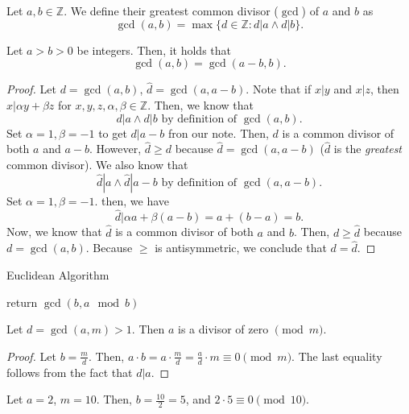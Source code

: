 \begin{definition}
	Let \( a,b \in \mathbb{Z} \). We define their greatest common divisor (\( \gcd \)) of \( a \) and \( b \) as \[
		\gcd(a,b) = \max\{d \in \mathbb{Z} : d|a \land d|b\}  
	.\] 
\end{definition}

\begin{prop}
	Let \( a>b>0 \) be integers. Then, it holds that \[
		\gcd (a,b) = \gcd (a-b,b)
	.\]
\end{prop}

\begin{proof}
	Let \( d=\gcd(a,b) \), \( \hat{d}=\gcd(a,a-b) \). Note that if \( x|y \) and \( x|z \), then \( x|\alpha y+\beta z \) for \( x,y,z,\alpha ,\beta \in \mathbb{Z} \). Then, we know that \[
		d|a \land d|b \text{ by definition of } \gcd(a,b)
	.\] Set \( \alpha =1,\beta =-1 \) to get \( d|a-b \) fron our note. Then, \( d \) is a common divisor of both \( a \) and \( a-b \). However, \( \hat{d}\ge d \) because \( \hat{d} = \gcd(a,a-b) \) (\( \hat{d} \) is the \emph{greatest} common divisor). We also know that \[
		\hat{d}|a \land \hat{d}|a-b \text{ by definition of } \gcd(a,a-b)
	.\] Set \( \alpha =1,\beta =-1 \). then, we have \[
		\hat{d}|\alpha a+\beta (a-b) = a + (b-a) = b
	.\] Now, we know that \( \hat{d} \) is a common divisor of both \( a \) and \( b \). Then, \( d \ge \hat{d} \) because \( d=\gcd(a,b) \). Because \( \ge   \) is antisymmetric, we conclude that \( d=\hat{d} \).
\end{proof}

\begin{algorithm}[H]
	\caption{Euclidean Algorithm}
	return $\gcd(b,a \mod b)$\;
\end{algorithm}

\begin{lemma}
	Let \( d=\gcd(a,m) > 1 \). Then \( a \) is a divisor of zero \( \pmod m \).
\end{lemma}

\begin{proof}
	Let \( b=\frac{m}{d} \). Then, \( a\cdot b=a\cdot \frac{m}{d}=\frac{a}{d}\cdot m \equiv 0 \pmod m \). The last equality follows from the fact that \( d|a \).
\end{proof}

\begin{eg}
	Let \( a=2 \), \( m=10 \). Then, \( b=\frac{10}{2}=5 \), and \( 2 \cdot 5 \equiv 0 \pmod {10} \).
\end{eg}


